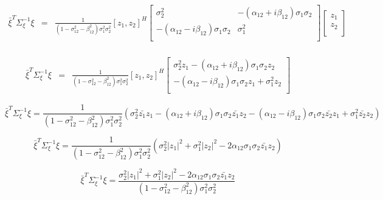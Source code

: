 \begin{equation}\label{eqn74}
\begin{array}{ccc}
	\bar{\xi}^{T}\Sigma_{\xi}^{-1}\xi&=&\frac{1}{(1 - \sigma_{12}^{2}- \beta_{12}^2)\sigma_{1}^2\sigma_{2}^2} [z_1,z_2]^{H}\left[
\begin{array}{cc}
	\sigma_2^2                                &  -(\alpha_{12}+i\beta_{12})\sigma_1\sigma_2  \\
	-(\alpha_{12}-i\beta_{12})\sigma_1\sigma_2 & \sigma_1^2 \\
\end{array}
\right]
	\left[
\begin{array}{c}
	z_1  \\
	z_2 \\
\end{array}\right]\\
\end{array}
\end{equation}

\begin{equation}\label{eqn75}
\begin{array}{ccc}
	\bar{\xi}^{T}\Sigma_{\xi}^{-1}\xi&=&\frac{1}{(1 - \sigma_{12}^{2}- \beta_{12}^2)\sigma_{1}^2\sigma_{2}^2} [z_1,z_2]^{H}\left[
\begin{array}{cc}
	\sigma_2^2z_1-(\alpha_{12}+i\beta_{12})\sigma_1\sigma_2z_2  \\
	-(\alpha_{12}-i\beta_{12})\sigma_1\sigma_2z_1+\sigma_1^2z_2 \\
\end{array}
\right]
\end{array}
\end{equation}

\begin{equation}\label{eqn76}
	\bar{\xi}^{T}\Sigma_{\xi}^{-1}\xi=\frac{1}{(1 - \sigma_{12}^{2}- \beta_{12}^2)\sigma_{1}^2\sigma_{2}^2}\left(
	\sigma_2^2\bar{z_1}z_1-(\alpha_{12}+i\beta_{12})\sigma_1\sigma_2\bar{z_1}z_2 
	-(\alpha_{12}-i\beta_{12})\sigma_1\sigma_2\bar{z_2}z_1+\sigma_1^2\bar{z_2}z_2 \right)
\end{equation}

\begin{equation}\label{eqn77}
	\bar{\xi}^{T}\Sigma_{\xi}^{-1}\xi=\frac{1}{(1 - \sigma_{12}^{2}- \beta_{12}^2)\sigma_{1}^2\sigma_{2}^2}\left(
	\sigma_2^2|z_1|^2+\sigma_1^2|z_2|^2-2\alpha_{12}\sigma_1\sigma_2\bar{z_1}z_2 	\right)
\end{equation}

\begin{equation}\label{eqn78}
	\bar{\xi}^{T}\Sigma_{\xi}^{-1}\xi=\frac{\sigma_2^2|z_1|^2+\sigma_1^2|z_2|^2-2\alpha_{12}\sigma_1\sigma_2\bar{z_1}z_2}{(1 - \sigma_{12}^{2}- \beta_{12}^2)\sigma_{1}^2\sigma_{2}^2}
\end{equation}


